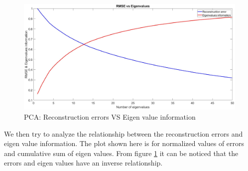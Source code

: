 \begin{figure}
	\captionsetup{format = hang}
	\includegraphics[height = 0.5\textwidth,width = 1.0\textwidth]{Exercise3/Report/pca_eigen}
	\caption{PCA: Reconstruction errors VS Eigen value information}\label{fig:pca_eigen}
\end{figure}
We then try to analyze the relationship between the reconstruction errors and eigen value information. The plot shown here is for normalized values of errors and cumulative sum of eigen values. From figure \ref{fig:pca_eigen} it can be noticed that the errors and eigen values have an inverse relationship.\\\\
 \newline
